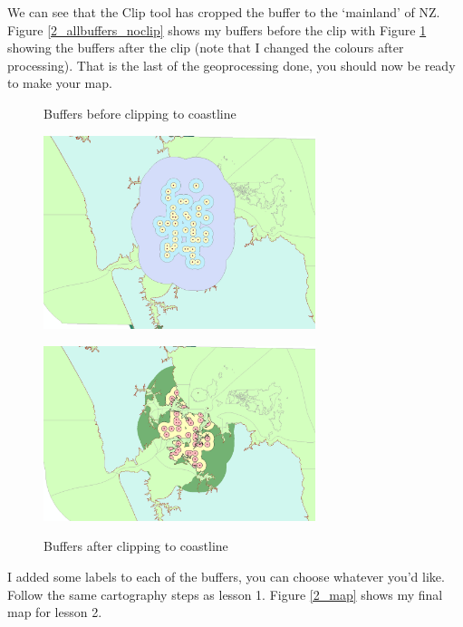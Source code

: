 \documentclass{article}
\begin{document}
We can see that the Clip tool has cropped the buffer to the `mainland' of NZ. Figure \ref{2_allbuffers_noclip} shows my buffers before the clip with Figure \ref{2_allbuffers_clipped} showing the buffers after the clip (note that I changed the colours after processing). That is the last of the geoprocessing done, you should now be ready to make your map.\pagebreak

\begin{figure}[h]
  \centering
  \begin{minipage}[b]{1\textwidth}
    \centering
    \caption{Buffers before clipping to coastline}
    \includegraphics[width=300px]{images/part2/allbuffers_noclip.PNG}
    \label{2_allbuffers_noclip}
  \end{minipage}

  \vspace{0.5cm}

  \begin{minipage}[b]{1\textwidth}
    \centering
    \caption{Buffers after clipping to coastline}
    \includegraphics[width=300px]{images/part2/allbuffers_clipped.PNG}
    \label{2_allbuffers_clipped}
  \end{minipage}
\end{figure}

I added some labels to each of the buffers, you can choose whatever you'd like. Follow the same cartography steps as lesson 1. Figure \ref{2_map} shows my final map for lesson 2. \pagebreak
\end{document}
